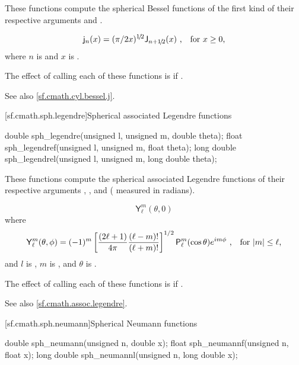 \begin{itemdescr}
\pnum
\effects
These functions compute
the spherical Bessel functions of the first kind
of their respective arguments
 and .

\pnum
\returns
\[ \mathsf{j}_n(x) = (\pi/2x)^{1\!/\!2} \mathsf{J}_{n + 1\!/\!2}(x) \text{ ,\quad for $x \ge 0$,} \]
where
$n$ is  and
$x$ is .

\pnum
\remarks
The effect of calling each of these functions
is 
if .

\pnum
See also \ref{sf.cmath.cyl.bessel.j}.
\end{itemdescr}

[sf.cmath.sph.legendre]{Spherical associated Legendre functions}%
%
%
%
%
%
%
\begin{itemdecl}
double       sph_legendre(unsigned l, unsigned m, double theta);
float        sph_legendref(unsigned l, unsigned m, float theta);
long double  sph_legendrel(unsigned l, unsigned m, long double theta);
\end{itemdecl}

\begin{itemdescr}
\pnum
\effects
These functions compute the spherical associated Legendre functions
of their respective arguments
, , and  ( measured in radians).

\pnum
\returns
\[ \mathsf{Y}_\ell^m(\theta, 0) \]
where
\[ \mathsf{Y}_\ell^m(\theta, \phi) =
     (-1)^m \left[\frac{(2 \ell + 1)}{4 \pi} \frac{(\ell - m)!}{(\ell + m)!}\right]^{1/2}
     \mathsf{P}_\ell^m (\cos\theta) e^{i m \phi}
     \text{ ,\quad for $|m| \le \ell$,}
\]
and
$l$ is ,
$m$ is , and
$\theta$ is .

\pnum
\remarks
The effect of calling each of these functions
is 
if .

\pnum
See also \ref{sf.cmath.assoc.legendre}.
\end{itemdescr}

[sf.cmath.sph.neumann]{Spherical Neumann functions}%
%
%
%
%
%
%
\begin{itemdecl}
double       sph_neumann(unsigned n, double x);
float        sph_neumannf(unsigned n, float x);
long double  sph_neumannl(unsigned n, long double x);
\end{itemdecl}

